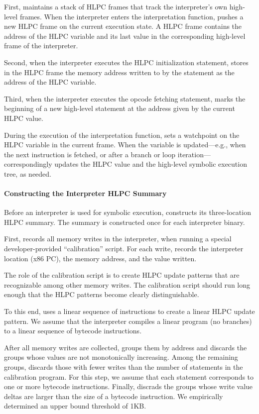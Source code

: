First, \chef maintains a stack of HLPC frames that track the interpreter's own high-level frames.
%
When the interpreter enters the interpretation function, \chef pushes a new HLPC frame on the current execution state.  A HLPC frame contains the address of the HLPC variable and its last value in the corresponding high-level frame of the interpreter.

Second, when the interpreter executes the HLPC initialization statement, \chef stores in the HLPC frame the memory address written to by the statement as the address of the HLPC variable.

Third, when the interpreter executes the opcode fetching statement, \chef marks the beginning of a new high-level statement at the address given by the current HLPC value.

During the execution of the interpretation function, \chef sets a watchpoint on the HLPC variable in the current frame.
%
When the variable is updated---e.g., when the next instruction is fetched, or after a branch or loop iteration---\chef correspondingly updates the HLPC value and the high-level symbolic execution tree, as needed.

\paragraph{Constructing the Interpreter HLPC Summary}

Before an interpreter is used for symbolic execution, \chef constructs its three-location HLPC summary.
%
The summary is constructed once for each interpreter binary.

First, \chef records all memory writes in the interpreter, when running a special developer-provided ``calibration'' script.
%
For each write, \chef records the interpreter location (x86 PC), the memory address, and the value written.

The role of the calibration script is to create HLPC update patterns that are recognizable among other memory writes.
%
The calibration script should run long enough that the HLPC patterns become clearly distinguishable.

To this end, \chef uses a linear sequence of instructions to create a linear HLPC update pattern.
%
We assume that the interpreter compiles a linear program (no branches) to a linear sequence of bytecode instructions.

After all memory writes are collected, \chef groups them by address and discards the groups whose values are not monotonically increasing.
%
Among the remaining groups, \chef discards those with fewer writes than the number of statements in the calibration program.  For this step, we assume that each statement corresponds to one or more bytecode instructions.
%
Finally, \chef discrads the groups whose write value deltas are larger than the size of a bytecode instruction.  We empirically determined an upper bound threshold of 1KB.

